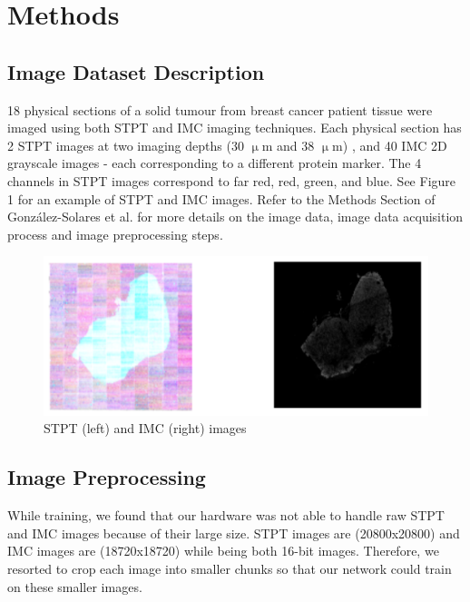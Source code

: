 \documentclass[10pt,twocolumn,letterpaper]{article}
\begin{document}
\section{Methods}
\label{sec:methods}

\subsection{Image Dataset Description}

18 physical sections of a solid tumour from breast cancer patient tissue were imaged using both STPT and IMC imaging techniques. Each physical section has 2 STPT  images at two imaging depths (30 $\upmu$m and 38 $\upmu$m) \cite{bressan}, and 40 IMC 2D grayscale images - each corresponding to a different protein marker. The 4 channels in STPT images correspond to far red, red, green, and blue. See Figure 1 for an example of STPT and IMC images. Refer to the Methods Section of González-Solares et al. \cite{gonzalez-solares} for more details on the image data, image data acquisition process and image preprocessing steps. 

\begin{figure}
	\centering
	\captionsetup{justification=centering}
		\hspace*{-0.2cm}	
		\includegraphics[scale=0.35]{../figures/imc_stpt_img4report.png}
	\caption{STPT (left) and IMC (right) images}		
\end{figure}

\subsection{Image Preprocessing}

While training, we found that our hardware was not able to handle raw STPT and IMC images because of their large size. STPT images are (20800x20800) and IMC images are (18720x18720) while being both 16-bit images. Therefore, we resorted to crop each image into smaller chunks so that our network could train on these smaller images. 
\end{document}
